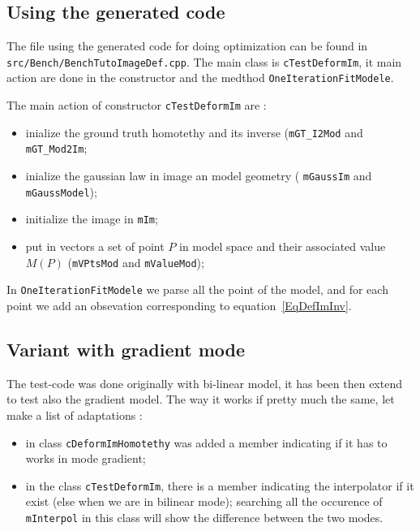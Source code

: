 \subsection{Using the generated code}

The file using the generated code for doing optimization can be found in 
{\tt src/Bench/BenchTutoImageDef.cpp}.  The main class is {\tt cTestDeformIm},
it main action are done in the constructor and the medthod {\tt OneIterationFitModele}.

The main action of constructor {\tt cTestDeformIm} are :

\begin{itemize}
    \item  inialize the ground truth homotethy and its inverse ({\tt mGT\_I2Mod} and {\tt mGT\_Mod2Im};
    \item  inialize the gaussian law in image an model geometry ( {\tt mGaussIm}  and {\tt mGaussModel});
    \item  initialize the image  in {\tt mIm}; 
    \item  put in vectors a set of point $P$ in model space and their associated value $M(P)$
           ({\tt mVPtsMod} and {\tt mValueMod});
\end{itemize}


In {\tt OneIterationFitModele} we parse all the point of the model, and for each point we
add an obsevation corresponding to equation~\ref{EqDefImInv}.


\subsection{Variant with gradient mode}

The test-code was done originally with bi-linear model, it has been then
extend to test also the gradient model. The way it works if pretty much the same, let
make a list of adaptations  :

\begin{itemize}
   \item in class {\tt cDeformImHomotethy} was added a member indicating if it has to works 
	   in mode gradient;
   \item in the class {\tt cTestDeformIm},  there is a member indicating the interpolator if
         it exist (else when  we are in bilinear mode); searching all the occurence of {\tt mInterpol} in
         this class will show the difference between the two modes.
\end{itemize}

